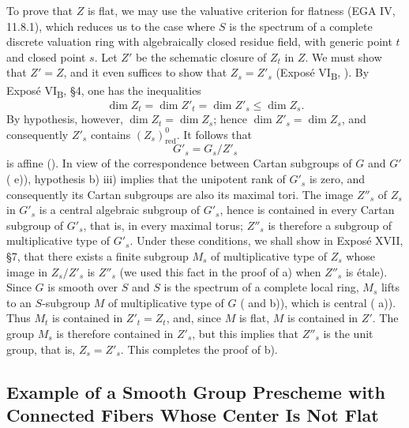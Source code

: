 To prove that \(Z\) is flat, we may use the valuative criterion
for flatness (EGA IV, 11.8.1), which reduces us to the case where
\(S\) is the spectrum of a complete discrete valuation ring with
algebraically closed residue field, with generic point \(t\) and
closed point \(s\). Let \(Z'\) be the schematic closure of \(Z_t\)
in \(Z\). We must show that \(Z'=Z\), and it even suffices to show
that \(Z_s=Z'_s\) (Exposé VI\textsubscript{B}, ). By Exposé
VI\textsubscript{B}, \S4, one has the inequalities
\[
  \dim Z_t=\dim Z'_t=\dim Z'_s\leq \dim Z_s.
\]
By hypothesis, however, \(\dim Z_t=\dim Z_s\); hence
\(\dim Z'_s=\dim Z_s\), and consequently \(Z'_s\) contains
\((Z_s)^0_{\mathrm{red}}\). It follows that
\[
  G'_s=G_s/Z'_s
\]
is affine (). In view of the correspondence between
Cartan subgroups of \(G\) and \(G'\) ( e)),
hypothesis  b) iii) implies that the unipotent rank of \(G'_s\)
is zero, and consequently its Cartan subgroups are also its
maximal tori. The image \(Z''_s\) of \(Z_s\) in \(G'_s\) is a
central algebraic subgroup of \(G'_s\), hence is contained in
every Cartan subgroup of \(G'_s\), that is, in every maximal
torus; \(Z''_s\) is therefore a subgroup of multiplicative type
of \(G'_s\). Under these conditions, we shall show in Exposé XVII,
\S7, that there exists a finite subgroup \(M_s\) of multiplicative
type of \(Z_s\) whose image in \(Z_s/Z'_s\) is \(Z''_s\) (we used
this fact in the proof of  a) when \(Z''_s\) is étale). Since
\(G\) is smooth over \(S\) and \(S\) is the spectrum of a complete
local ring, \(M_s\) lifts to an \(S\)-subgroup \(M\) of
multiplicative type of \(G\) ( and  b)), which is central ( a)). Thus \(M_t\) is
contained in \(Z'_t=Z_t\), and, since \(M\) is flat, \(M\) is
contained in \(Z'\). The group \(M_s\) is therefore contained in
\(Z'_s\), but this implies that \(Z''_s\) is the unit group, that
is, \(Z_s=Z'_s\). This completes the proof of  b).

\subsection*{Example of a Smooth Group Prescheme with Connected Fibers
Whose Center Is Not Flat}


